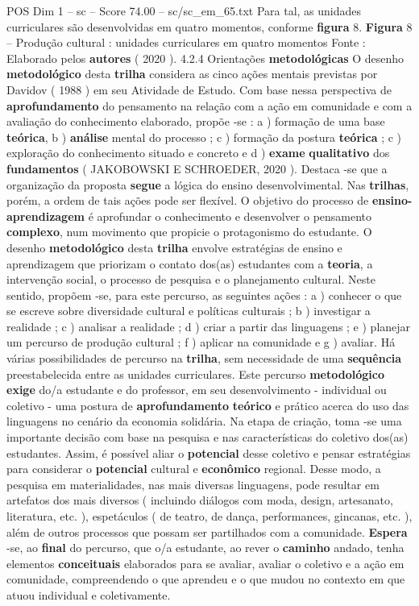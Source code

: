 \begin{textsample}{POS Dim 1 – sc – Score 74.00 – sc/sc\_em\_65.txt}
Para tal, as unidades curriculares são desenvolvidas em quatro momentos, conforme \textbf{figura} 8. \textbf{Figura} 8 – Produção cultural : unidades curriculares em quatro momentos Fonte : Elaborado pelos \textbf{autores} ( 2020 ). 4.2.4 Orientações \textbf{metodológicas} O desenho \textbf{metodológico} desta \textbf{trilha} considera as cinco ações mentais previstas por Davidov ( 1988 ) em seu Atividade de Estudo.
Com base nessa perspectiva de \textbf{aprofundamento} do pensamento na relação com a ação em comunidade e com a avaliação do conhecimento elaborado, propõe -se : a ) formação de uma base \textbf{teórica}, b ) \textbf{análise} mental do processo ; c ) formação da postura \textbf{teórica} ; c ) exploração do conhecimento situado e concreto e d ) \textbf{exame} \textbf{qualitativo} dos \textbf{fundamentos} ( JAKOBOWSKI E SCHROEDER, 2020 ).
Destaca -se que a organização da proposta \textbf{segue} a lógica do ensino desenvolvimental.
Nas \textbf{trilhas}, porém, a ordem de tais ações pode ser flexível.
O objetivo do processo de \textbf{ensino-aprendizagem} é aprofundar o conhecimento e desenvolver o pensamento \textbf{complexo}, num movimento que propicie o protagonismo do estudante.
O desenho \textbf{metodológico} desta \textbf{trilha} envolve estratégias de ensino e aprendizagem que priorizam o contato dos(as) estudantes com a \textbf{teoria}, a intervenção social, o processo de pesquisa e o planejamento cultural.
Neste sentido, propõem -se, para este percurso, as seguintes ações : a ) conhecer o que se escreve sobre diversidade cultural e políticas culturais ; b ) investigar a realidade ; c ) analisar a realidade ; d ) criar a partir das linguagens ; e ) planejar um percurso de produção cultural ; f ) aplicar na comunidade e g ) avaliar.
Há várias possibilidades de percurso na \textbf{trilha}, sem necessidade de uma \textbf{sequência} preestabelecida entre as unidades curriculares.
Este percurso \textbf{metodológico} \textbf{exige} do/a estudante e do professor, em seu desenvolvimento - individual ou coletivo - uma postura de \textbf{aprofundamento} \textbf{teórico} e prático acerca do uso das linguagens no cenário da economia solidária.
Na etapa de criação, toma -se uma importante decisão com base na pesquisa e nas características do coletivo dos(as) estudantes.
Assim, é possível aliar o \textbf{potencial} desse coletivo e pensar estratégias para considerar o \textbf{potencial} cultural e \textbf{econômico} regional.
Desse modo, a pesquisa em materialidades, nas mais diversas linguagens, pode resultar em artefatos dos mais diversos ( incluindo diálogos com moda, design, artesanato, literatura, etc. ), espetáculos ( de teatro, de dança, performances, gincanas, etc. ), além de outros processos que possam ser partilhados com a comunidade. \textbf{Espera} -se, ao \textbf{final} do percurso, que o/a estudante, ao rever o \textbf{caminho} andado, tenha elementos \textbf{conceituais} elaborados para se avaliar, avaliar o coletivo e a ação em comunidade, compreendendo o que aprendeu e o que mudou no contexto em que atuou individual e coletivamente.

\end{textsample}
